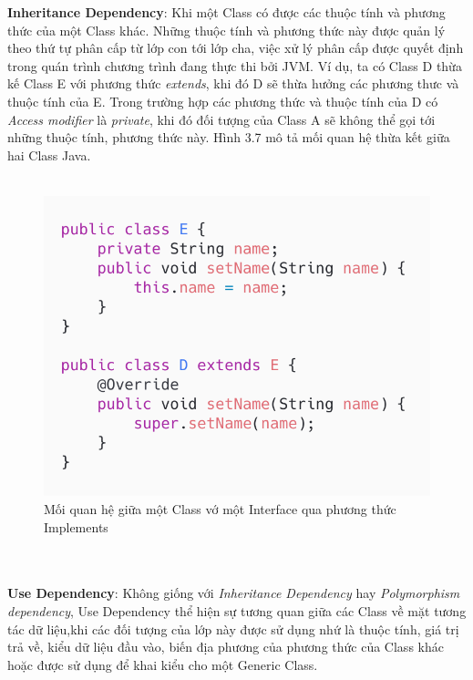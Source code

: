 \documentclass[12pt]{report}
\begin{document}
\pagebreak
\noindent \textbf{Inheritance Dependency}: Khi một Class có được các thuộc tính và phương thức của một Class khác. Những thuộc tính và phương thức này được quản lý theo thứ tự phân cấp từ lớp con tới lớp cha, việc xử lý phân cấp được quyết định trong quán trình chương trình đang thực thi bởi JVM. Ví dụ, ta có Class D thừa kế Class E với phương thức \textit{extends}, khi đó D sẽ thừa hưởng các phương thưc và thuộc tính của E. Trong trường hợp các phương thức và thuộc tính của D có \textit{Access modifier} là \textit{private}, khi đó đối tượng của Class A sẽ không thể gọi tới những thuộc tính, phương thức này. Hình 3.7 mô tả mối quan hệ thừa kết giữa hai Class Java.\\\\
\begin{figure}[!htbp]
	\centering
	\includegraphics[scale=0.5]{images/D_extends_E}
	\caption{Mối quan hệ giữa một Class vớ một Interface qua phương thức Implements}
	\label{fig:D_extends_E}
\end{figure}\\\\
\textbf{Use Dependency}: Không giống với \textit{Inheritance Dependency} hay \textit{Polymorphism dependency}, Use Dependency thể hiện sự tương quan giữa các Class về mặt tương tác dữ liệu,khi các đối tượng của lớp này được sử dụng nhứ là thuộc tính, giá trị trả về, kiểu dữ liệu đầu vào, biến địa phương của phương thức của Class khác hoặc được sử dụng để khai kiểu cho một Generic Class.
\end{document}
